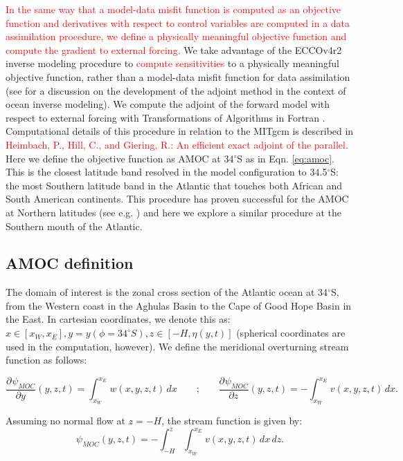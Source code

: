 \documentclass[a4paper,11pt]{article}
\newcommand{\pderiv}[3][]{%
  \ensuremath{\frac{\partial^{#1} {#2}}{\partial {#3}^{#1}}}}
\newcommand{\red}[1]{\textcolor{red}{#1}}
\begin{document}
	\red{In the same way that a model-data misfit function is computed as an objective function and derivatives with respect to control variables are computed in a data assimilation procedure, we define a physically meaningful objective function and compute the gradient to external forcing.  }
	We take advantage of the ECCOv4r2 inverse modeling procedure to \red{compute sensitivities} to a physically meaningful objective function, rather than a model-data misfit function for data assimilation (see \cite{forgetECCOv4} for a discussion on the development of the adjoint method in the context of ocean inverse modeling). We compute the adjoint of the forward model with respect to external forcing with Transformations of Algorithms in Fortran \cite{giering2005}. Computational details of this procedure in relation to the MITgcm is described in \red{Heimbach, P., Hill, C., and Giering, R.: An efficient exact adjoint of the parallel}. Here we define the objective function as AMOC at 34$^{\circ}$S as in Eqn. \ref{eq:amoc}. This is the closest latitude band resolved in the model configuration to 34.5$^{\circ}$S: the most Southern latitude band in the Atlantic that touches both African and South American continents. This procedure has proven successful for the AMOC at Northern latitudes (see e.g. \cite{pillarAttribution} \cite{heimbachTimescales} \cite{czeschelOscillatory}) and here we explore a similar procedure at the Southern mouth of the Atlantic. 

  \subsection{AMOC definition}
  
    The domain of interest is the zonal cross section of the Atlantic ocean at 34$^{\circ}$S, from the Western coast in the Aghulas Basin to the Cape of Good Hope Basin in the East. In cartesian coordinates, we denote this as: $x \in [x_W,x_E], y = y(\phi=34^{\circ}S), z \in [-H,\eta(y,t)]$ (spherical coordinates are used in the computation, however).  We define the meridional overturning stream function as follows: 
    
    \begin{equation}
      \pderiv[]{\psi_{MOC}}{y}(y,z,t) = \int_{x_W}^{x_E}w(x,y,z,t)\,dx \qquad\text{;}\qquad \pderiv[]{\psi_{MOC}}{z}(y,z,t) = -\int_{x_W}^{x_E}v(x,y,z,t)\,dx .
     \label{eq:mocStf}
    \end{equation}

   Assuming no normal flow at $z = -H$, the stream function is given by:
   \begin{equation}
    \psi_{MOC}(y,z,t) = -\int_{-H}^{z}\int_{x_W}^{x_E}v(x,y,z,t)\,dx\,dz .
    \label{eq:mocStf2}
   \end{equation}
\end{document}
